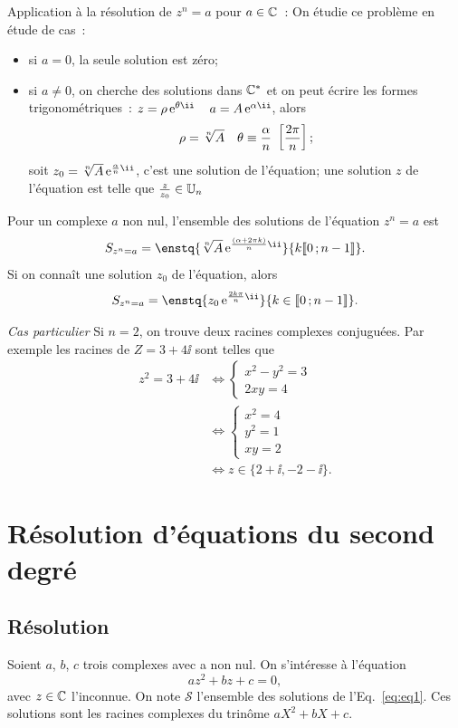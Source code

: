 Application à la résolution de $z^n=a$ pour $a \in \mathbb{C}$~: On étudie ce problème en étude de cas~:
\begin{itemize}
\item si $a=0$, la seule solution est zéro;
\item si $a \neq 0$, on cherche des solutions dans $\mathbb{C}^*$ et on peut écrire les formes trigonométriques~: $z=\expc{\rho}{\theta} \quad a = \expc{A}{\alpha}$, alors 
  \begin{equation}
    \rho = \sqrt[n]{A} \quad \theta \equiv \frac{\alpha}{n}~\left[\frac{2\pi}{n} \right];
  \end{equation}
  soit $z_0=\expc{\sqrt[n]{A} }{\frac{\alpha}{n}}$, c'est une solution de l'équation; une solution $z$ de l'équation est telle que $\frac{z}{z_0} \in \mathbb{U}_n$
\end{itemize}
%
\begin{prop}
  Pour un complexe $a$ non nul, l'ensemble des solutions de l'équation $z^n=a$ est 
  \begin{equation}
    S_{z^n=a}=\enstq{\expc{\sqrt[n]{A}}{\frac{(\alpha + 2\pi k)}{n}}}{k \intervalleentier{0}{n-1}}.
  \end{equation}
  Si on connaît une solution $z_0$ de l'équation, alors
  \begin{equation}
    S_{z^n=a}=\enstq{\expc{z_0}{\frac{2 k \pi}{n}}}{k \in \intervalleentier{0}{n-1}}.
  \end{equation}
\end{prop}
\emph{Cas particulier}
Si $n=2$, on trouve deux racines complexes conjuguées. Par exemple les racines de $Z=3+4\ii$ sont telles que 
\begin{align} 
  z^2=3+4\ii & \iff  \begin{cases} x^2-y^2=3 \\ 2xy=4 \end{cases} \\
  & \iff \begin{cases} x^2=4 \\ y^2=1 \\ xy=2 \end{cases} \\
  & \iff z \in \{2+\ii, -2-\ii\}.
\end{align}
%
\section{Résolution d'équations du second degré}
\label{sec:resolutionequationseconddegre}
\subsection{Résolution}
\label{subsec:resolution}
Soient $a$, $b$, $c$ trois complexes avec a non nul. On s'intéresse à l'équation
\begin{equation}
  \label{eq:eq1}
  az^2+bz+c=0,
\end{equation}
avec $z \in \mathbb{C}$ l'inconnue. On note $\mathcal{S}$ l'ensemble des solutions de l'Eq.~\eqref{eq:eq1}. Ces solutions sont les racines complexes du trinôme $aX^2+bX+c$.

